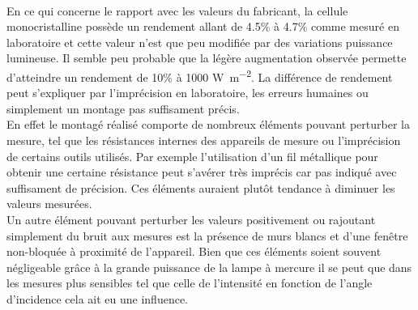 \paragraph{}
En ce qui concerne le rapport avec les valeurs du fabricant, la cellule monocristalline possède un rendement allant de 4.5\% à 4.7\% comme mesuré en laboratoire et cette valeur n'est que peu modifiée par des variations puissance lumineuse. Il semble peu probable que la légère augmentation observée permette d'atteindre un rendement de 10\% à 1000 \unit{\watt\per\meter^2}. La différence de rendement peut s'expliquer par l'imprécision en laboratoire, les erreurs humaines ou simplement un montage pas suffisament précis. \\
En effet le montagé réalisé comporte de nombreux éléments pouvant perturber la mesure, tel que les résistances internes des appareils de mesure ou l'imprécision de certains outils utilisés. Par exemple l'utilisation d'un fil métallique pour obtenir une certaine résistance peut s'avérer très imprécis car pas indiqué avec suffisament de précision. Ces éléments auraient plutôt tendance à diminuer les valeurs mesurées. \\
Un autre élément pouvant perturber les valeurs positivement ou rajoutant simplement du bruit aux mesures est la présence de murs blancs et d'une fenêtre non-bloquée à proximité de l'appareil. Bien que ces éléments soient souvent négligeable grâce à la grande puissance de la lampe à mercure il se peut que dans les mesures plus sensibles tel que celle de l'intensité en fonction de l'angle d'incidence cela ait eu une influence.
